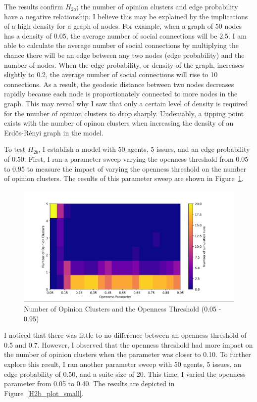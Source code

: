 The results confirm $H_{2a}$; the number of opinion clusters and edge probability have a negative relationship. I believe this may be explained by the implications of a high density for a graph of nodes. For example, when a graph of 50 nodes has a density of 0.05, the average number of social connections will be 2.5. I am able to calculate the average number of social connections by multiplying the chance there will be an edge between any two nodes (edge probability) and the number of nodes. When the edge probability, or density of the graph, increases slightly to 0.2, the average number of social connections will rise to 10 connections. As a result, the geodesic distance between two nodes decreases rapidly because each node is proportionately connected to more nodes in the graph. This may reveal why I saw that only a certain level of density is required for the number of opinion clusters to drop sharply. Undeniably, a tipping point exists with the number of opinon clusters when increasing the density of an Erd\"{o}s-R\'{e}nyi graph in the model.  

To test $H_{2b}$, I establish a model with 50 agents, 5 issues, and an edge
probability of 0.50. First, I ran a parameter sweep varying the openness
threshold from 0.05 to 0.95 to measure the impact of varying the openness
threshold on the number of opinion clusters. The results of this parameter
sweep are shown in Figure~\ref{H2b_plot_big}.

\begin{figure}
\centering
\includegraphics[width=1.0\columnwidth]{./Graphs/Cluster_openBig.png}
\caption{Number of Opinion Clusters and the Openness Threshold (0.05 - 0.95)}
\label{H2b_plot_big}
\end{figure}

I noticed that there was little to no difference between an openness threshold
of 0.5 and 0.7. However, I observed that the openness threshold had more
impact on the number of opinion clusters when the parameter was closer to 0.10.
To further explore this result, I ran another parameter sweep with 50 agents,
5 issues, an edge probability of 0.50, and a suite size of 20. This time, I
varied the openness parameter from 0.05 to 0.40. The results are depicted in
Figure~\ref{H2b_plot_small}.

